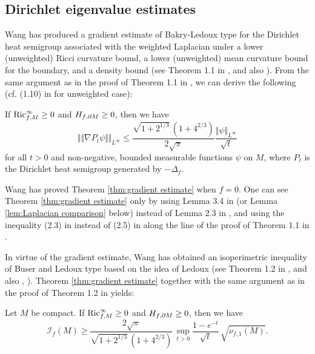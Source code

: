 \subsection{Dirichlet eigenvalue estimates}\label{sec:Isoperimetric inequalities}
Wang \cite{Wa} has produced a gradient estimate of Bakry-Ledoux type for the Dirichlet heat semigroup associated with the weighted Laplacian under a lower (unweighted) Ricci curvature bound,
a lower (unweighted) mean curvature bound for the boundary,
and a density bound (see Theorem 1.1 in \cite{Wa}, and also \cite{BL}).
From the same argument as in the proof of Theorem 1.1 in \cite{Wa},
we can derive the following (cf. (1.10) in \cite{Wa} for unweighted case):
\begin{thm}[\cite{Wa}]\label{thm:gradient estimate}
If $\operatorname{Ric}^{\infty}_{f,M}\geq 0$ and $H_{f,\partial M}\geq 0$,
then we have
\begin{equation*}
\Vert \Vert \nabla P_{t}\psi \Vert \Vert_{L^{\infty}}\leq \frac{\sqrt{1+2^{1/3}}\,(1+4^{2/3})}{2\sqrt{\pi}} \frac{\Vert \psi \Vert_{L^{\infty}}}{\sqrt{t}}
\end{equation*}
for all $t>0$ and non-negative, bounded measurable functions $\psi$ on $M$,
where $P_{t}$ is the Dirichlet heat semigroup generated by $-\Delta_{f}$.
\end{thm}
Wang \cite{Wa} has proved Theorem \ref{thm:gradient estimate} when $f=0$.
One can see Theorem \ref{thm:gradient estimate} only by using Lemma 3.4 in \cite{S1} (or Lemma \ref{lem:Laplacian comparison} below) instead of Lemma 2.3 in \cite{Wa},
and using the inequality (2.3) in \cite{CW} instead of (2.5) in \cite{Wa} along the line of the proof of Theorem 1.1 in \cite{Wa}.

In virtue of the gradient estimate,
Wang \cite{Wa} has obtained an isoperimetric inequality of Buser and Ledoux type based on the idea of Ledoux \cite{L1} (see Theorem 1.2 in \cite{Wa}, and also \cite{Bu}, \cite{L1}).
Theorem \ref{thm:gradient estimate} together with the same argument as in the proof of Theorem 1.2 in \cite{Wa} yields:
\begin{thm}[\cite{Wa}]\label{thm:Buser Ledoux}
Let $M$ be compact.
If $\operatorname{Ric}^{\infty}_{f,M}\geq 0$ and $H_{f,\partial M}\geq 0$,
then we have
\begin{equation}\label{eq:Buser Ledoux}
\mathcal{I}_{f}(M) \geq \frac{2\sqrt{\pi}}{\sqrt{1+2^{1/3}}\,(1+4^{2/3})}\,\sup_{t>0}\frac{1-e^{-t}}{\sqrt{t}}\, \sqrt{\nu_{f,1}(M)}.
\end{equation}
\end{thm}

